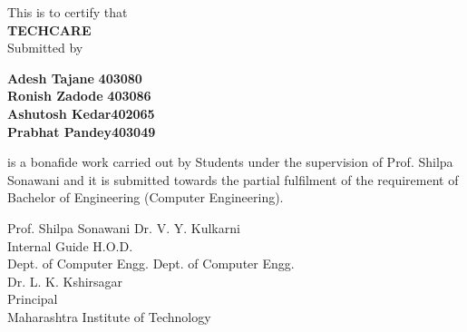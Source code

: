 \documentclass[12pt,a4paper]{report}
\begin{document}
	\begin{center}
This is to certify that \\
\textbf{\large TECHCARE}\\
Submitted by\\
	\begin{flushleft}
		\begin{flushleft}
\hspace{1.7in}\textbf{Adesh Tajane}
\hspace{0.38in}\textbf{  403080}\\
\hspace{1.7in}\textbf{Ronish Zadode}    
 \hspace{0.3in}\textbf{  403086}\\
\hspace{1.7in}\textbf{Ashutosh Kedar}\hspace{0.3in}\textbf{402065}\\
\hspace{1.7in}\textbf{Prabhat Pandey}\hspace{0.3in}\textbf{403049}\\
\end{flushleft}
	\end{flushleft}
	
	is a bonafide work carried out by Students under the supervision of Prof. Shilpa Sonawani and it is submitted towards the partial fulfilment of the requirement of Bachelor of Engineering (Computer Engineering).
	\vspace{0.3 in}
		\begin{center}
	Prof. Shilpa Sonawani \hspace{0.95 in} \hspace{0.95 in} \hspace{0.95 in}Dr. V. Y. Kulkarni\\
	Internal Guide \hspace{0.9 in} \hspace{0.9 in} \hspace{0.9 in} \hspace{0.9 in} H.O.D.\\
	Dept. of Computer Engg. \hspace{0.7 in} \hspace{0.7 in} \hspace{0.7 in} Dept. of Computer Engg.\\

		Dr. L. K. Kshirsagar\\
		Principal\\
		Maharashtra Institute of Technology
	

\end{center}
\end{center}
\end{document}

